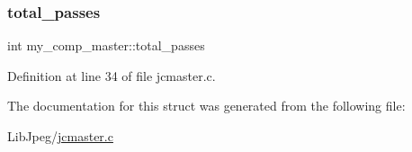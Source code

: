 \subsubsection{\texorpdfstring{total\_passes}{total\_passes}}
{\footnotesize\ttfamily int my\+\_\+comp\+\_\+master\+::total\+\_\+passes}



Definition at line 34 of file jcmaster.\+c.



The documentation for this struct was generated from the following file\+:\begin{DoxyCompactItemize}
\item 
Lib\+Jpeg/\mbox{\hyperlink{jcmaster_8c}{jcmaster.\+c}}\end{DoxyCompactItemize}
